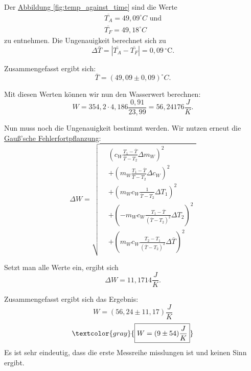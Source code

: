 Der \hyperref[fig:temp_against_time]{Abbildung \ref*{fig:temp_against_time}} sind die Werte
\begin{align}
    \overline{T_A} = 49,09^\circ C  \text{ und}\\
    \overline{T_F} = 49,18^\circ C
\end{align}
zu entnehmen. Die Ungenauigkeit berechnet sich zu
\begin{equation}
    \Delta \bar{T} = \left| \overline{T_A} - \overline{T_F} \right| = 0,09 \, \mathrm{^\circ C}.
\end{equation}

Zusammengefasst ergibt sich:
\begin{equation}
    \bar{T} = (49,09 \pm 0,09) ^\circ C.
\end{equation}

Mit diesen Werten können wir nun den Wasserwert berechnen:
\begin{equation}
    W = 354,2 \cdot 4,186 \frac{0,91}{23,99} = 56,24176 \frac{J}{K}.
\end{equation}

Nun muss noch die Ungenauigkeit bestimmt werden. Wir nutzen erneut die \hyperref[eq:gauss_fehlfortpflanzung]{Gauß'sche Fehlerfortpflanzung}:
\begin{equation}
    \Delta W = 
    \sqrt{
    \begin{aligned}
    &\left( c_W \frac{T_1 - \overline{T}}{\overline{T} - T_2} \Delta m_W \right)^2 \\
    &+ \left( m_W \frac{T_1 - \overline{T}}{\overline{T} - T_2} \Delta c_W \right)^2 \\
    &+ \left( m_W c_W \frac{1}{\overline{T} - T_2} \Delta T_1 \right)^2 \\
    &+ \left( - m_W c_W \frac{T_1 - \overline{T}}{(\overline{T} - T_2)^2} \Delta T_2 \right)^2 \\
    &+ \left( m_W c_W \frac{T_2 - T_1}{(\overline{T} - T_2)^2} \Delta \overline{T} \right)^2
    \end{aligned}
    }
    \label{eq:deltaW}
\end{equation}

Setzt man alle Werte ein, ergibt sich
\begin{equation}
    \Delta W = 11,1714 \frac{J}{K}.
\end{equation}

Zusammengefasst ergibt sich das Ergebnis:
\begin{equation}
    \boxed{W = (56,24 \pm 11,17) \frac{J}{K}}
\end{equation}
\begin{equation*}
    \textcolor{gray}{
        \boxed{W = (9 \pm 54) \frac{J}{K}}
    }
\end{equation*}
Es ist sehr eindeutig, dass die erste Messreihe misslungen ist und keinen Sinn ergibt.

